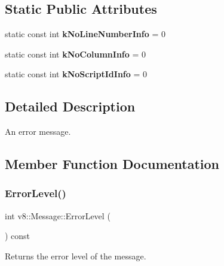 \subsection*{Static Public Attributes}
\begin{DoxyCompactItemize}
\item 
\mbox{\label{classv8_1_1Message_a35649a6c0c813ba82c9886a2b17da124}} 
static const int {\bfseries k\+No\+Line\+Number\+Info} = 0
\item 
\mbox{\label{classv8_1_1Message_a8cb643dbf408b0fd2526b23a8202c4a6}} 
static const int {\bfseries k\+No\+Column\+Info} = 0
\item 
\mbox{\label{classv8_1_1Message_a5aac643173466e88544cb1daa74553d6}} 
static const int {\bfseries k\+No\+Script\+Id\+Info} = 0
\end{DoxyCompactItemize}


\subsection{Detailed Description}
An error message. 

\subsection{Member Function Documentation}
\mbox{\label{classv8_1_1Message_a91bb679f695d82c2c2228645ca4497c6}} 
\subsubsection{\texorpdfstring{Error\+Level()}{ErrorLevel()}}
{\footnotesize\ttfamily int v8\+::\+Message\+::\+Error\+Level (\begin{DoxyParamCaption}{ }\end{DoxyParamCaption}) const}

Returns the error level of the message. \mbox{\label{classv8_1_1Message_ae188ca2457adbb3628681782bc757dc8}} 
